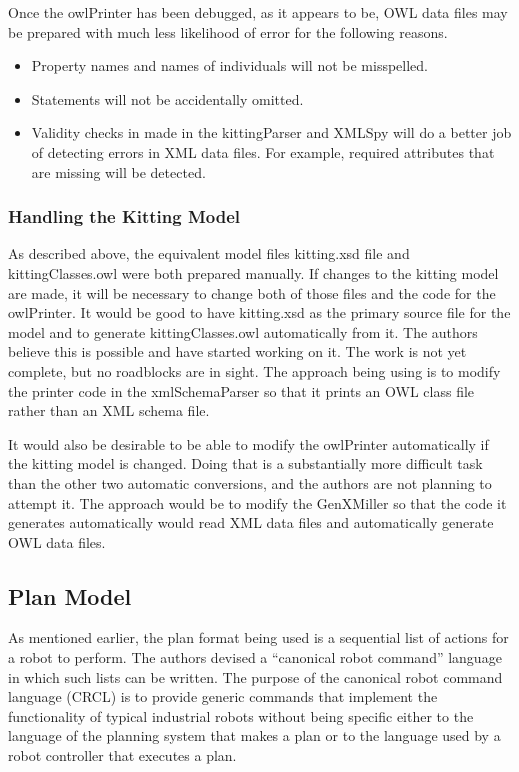 Once the owlPrinter has been debugged, as it appears to be, OWL data files
may be prepared with much less likelihood of error for the following
reasons.
\begin{itemize}

\item Property names and names of individuals will not be misspelled.

\item Statements will not be accidentally omitted.

\item Validity checks in made in the kittingParser and XMLSpy will do a
  better job of detecting errors in XML data files. For example, required
  attributes that are missing will be detected.

\end{itemize}

\subsubsection{Handling the Kitting Model}

As described above, the equivalent model files kitting.xsd file and
kittingClasses.owl were both prepared manually. If changes to the kitting
model are made, it will be necessary to change both of those files and the
code for the owlPrinter. It would be good to have kitting.xsd as the
primary source file for the model and to generate kittingClasses.owl
automatically from it. The authors believe this is possible and have
started working on it. The work is not yet complete, but no roadblocks are
in sight. The approach being using is to modify the printer code in the
xmlSchemaParser so that it prints an OWL class file rather than an XML
schema file.

It would also be desirable to be able to modify the owlPrinter
automatically if the kitting model is changed. Doing that is a
substantially more difficult task than the other two automatic conversions,
and the authors are not planning to attempt it. The approach would be to
modify the GenXMiller so that the code it generates automatically would
read XML data files and automatically generate OWL data files.


\subsection{Plan Model}

As mentioned earlier, the plan format being used is a sequential list of
actions for a robot to perform. The authors devised a ``canonical robot
command'' language in which such lists can be written. The purpose of the
canonical robot command language (CRCL) is to provide generic commands that
implement the functionality of typical industrial robots without being
specific either to the language of the planning system that makes a plan or
to the language used by a robot controller that executes a plan. 


